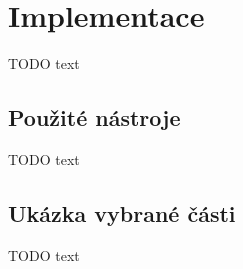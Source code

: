 \chapter{Implementace}

TODO text

\section{Použité nástroje}

TODO text

\section{Ukázka vybrané části}

TODO text

